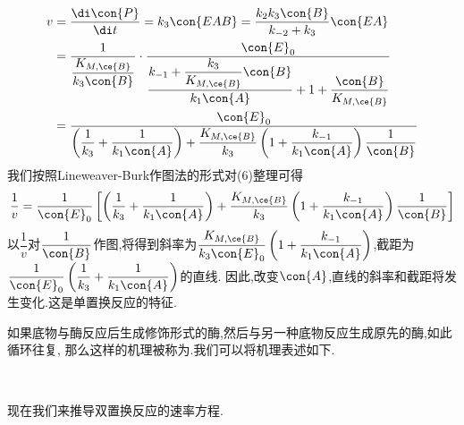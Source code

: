 \documentclass{ctexart}
\begin{document}
\begin{derivation}
\begin{equation}
\begin{aligned}
            v
            &= \dfrac{\di\con{P}}{\di t}=k_3\con{EAB}=\dfrac{k_2k_3\con{B}}{k_{-2}+k_3}\con{EA} \\
            &= \dfrac{1}{\dfrac{K_{M,\ce{B}}}{k_3\con{B}}}\cdot\dfrac{\con{E}_0}{\dfrac{k_{-1}+\dfrac{k_3}{K_{M,\ce{B}}}\con{B}}{k_1\con{A}}+1+\dfrac{\con{B}}{K_{M,\ce{B}}}} \\
            &= \dfrac{\con{E}_0}{\left(\dfrac{1}{k_3}+\dfrac{1}{k_1\con{A}}\right)+\dfrac{K_{M,\ce{B}}}{k_3}\left(1+\dfrac{k_{-1}}{k_1\con{A}}\right)\dfrac{1}{\con{B}}}
        \end{aligned}
    \end{equation}
    我们按照Lineweaver-Burk作图法的形式对(6)整理可得
    \begin{equation}
        \dfrac{1}{v}
        =\dfrac{1}{\con{E}_0}\left[\left(\dfrac{1}{k_3}+\dfrac{1}{k_1\con{A}}\right)+\dfrac{K_{M,\ce{B}}}{k_3}\left(1+\dfrac{k_{-1}}{k_1\con{A}}\right)\dfrac{1}{\con{B}}\right]
    \end{equation}
    以$\dfrac{1}{v}$对$\dfrac{1}{\con{B}}$作图,将得到斜率为$\dfrac{K_{M,\ce{B}}}{k_3\con{E}_0}\left(1+\dfrac{k_{-1}}{k_1\con{A}}\right)$,截距为$\dfrac{1}{\con{E}_0}\left(\dfrac{1}{k_3}+\dfrac{1}{k_1\con{A}}\right)$的直线.%
    因此,改变$\con{A}$,直线的斜率和截距将发生变化.这是单置换反应的特征.
\end{derivation}
如果底物与酶反应后生成修饰形式的酶,然后与另一种底物反应生成原先的酶,如此循环往复,%
那么这样的机理被称为.我们可以将机理表述如下.
\begin{tightcenter}
    \\
\end{tightcenter}
现在我们来推导双置换反应的速率方程.
\end{document}
